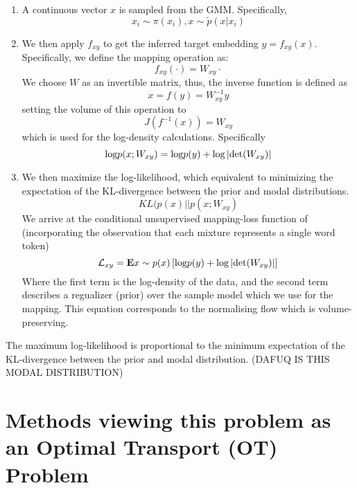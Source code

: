 \documentclass[a4paper,12pt,twoside,openright]{report}
\begin{document}
\begin{enumerate}
\item A continuous vector $x$ is sampled from the GMM. 
Specifically,
\begin{equation}
x_i \sim \pi(x_i), x \sim \tilde{p}(x|x_i) 
\end{equation}
\item We then apply $f_{xy}$ to get the inferred target embedding $y = f_{xy}(x)$.
Specifically, we define the mapping operation as: 
\begin{equation}
f_{xy}(\cdot) = W_{xy} \cdot
\end{equation}
We choose $W$ as an invertible matrix, thus, the inverse function is defined as 
\begin{equation}
x = f(y) = W_{xy}^{-1} y
\end{equation}
setting the volume of this operation to $$ J(f^{-1}(x)) = W_{xy} $$ which is used for the log-density calculations.
Specifically
\begin{equation}
\text{log} p(x; W_{xy}) = \text{log} p(y) + \text{log} \left|\text{det}(W_{xy})\right|
\end{equation}
\item We then maximize the log-likelihood, which equivalent to minimizing the expectation of the KL-divergence between the prior and modal distributions.
\begin{equation}
KL ( p(x) || p(x; W_{xy} )
\end{equation}
We arrive at the conditional unsupervised mapping-loss function of (incorporating the observation that each mixture represents a single word token)
\begin{equation}
\mathcal{L}_{xy} = \mathbf{E}{x \sim p(x)} \left[ \text{log} p(y) + \text{log} \left| \text{det} (W_{xy})\right| \right]
\end{equation}
Where the first term is the log-density of the data, and the second term describes a regualizer (prior) over the sample model which we use for the mapping. 
This equation corresponds to the normalising flow which is volume-preserving.
\end{enumerate}

The maximum log-likelihood is proportional to the minimum expectation of the KL-divergence between the prior and modal distribution. (DAFUQ IS THIS MODAL DISTRIBUTION)

\section{Methods viewing this problem as an Optimal Transport (OT) Problem}
\end{document}
